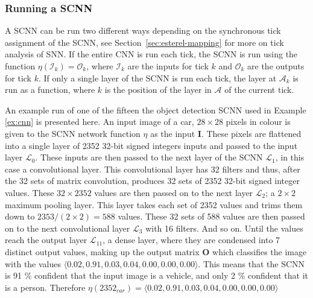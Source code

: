 \subsubsection{Running a \ac{SCNN}}
A \ac{SCNN} can be run two different ways depending on the synchronous tick assignment of the \ac{SCNN}, see Section~\ref{sec:esterel-mapping} for more on tick analysis of \ac{SNN}. 
If the entire CNN is run each tick, the \ac{SCNN} is run using the function $\eta(\mathcal{I}_k) = \mathcal{O}_k$, where $\mathcal{I}_k$ are the inputs for tick $k$ and $\mathcal{O}_k$ are the outputs for tick $k$.
If only a single layer of the \ac{SCNN} is run each tick, the layer at $\mathcal{A}_k$ is run as a function, where $k$ is the position of the layer in $\mathcal{A}$ of the current tick.

\begin{example}
	\label{ex:runcnn}
	An example run of one of the fifteen the object detection \ac{SCNN} used in Example \ref{ex:cnn} is presented here.
	An input image of a car, $28 \times 28$ pixels in colour is given to the \ac{SCNN} network function $\eta$ as the input \textbf{I}.
	These pixels are flattened into a single layer of 2352 32-bit signed integers inputs and passed to the input layer $\mathcal{L}_0$.
	These inputs are then passed to the next layer of the \ac{SCNN} $\mathcal{L}_1$, in this case a convolutional layer.
	This convolutional layer has 32 filters and thus, after the 32 sets of matrix convolution, produces 32 sets of 2352 32-bit signed integer values.
	These $32 \times 2352$ values are then passed on to the next layer $\mathcal{L}_2$; a $2 \times 2$ maximum pooling layer.
	This layer takes each set of 2352 values and trims them down to $2353 / (2 \times 2) = 588$ values.
	These 32 sets of 588 values are then passed on to the next convolutional layer $\mathcal{L}_3$ with 16 filters.
	And so on.
	Until the values reach the output layer $\mathcal{L}_11$, a dense layer, where they are condensed into 7 distinct output values, making up the output matrix \textbf{O} which classifies the image with the values $\langle 0.02, 0.91, 0.03, 0.04, 0.00, 0.00, 0.00 \rangle$.
	This means that the \ac{SCNN} is 91 \% confident that the input image is a vehicle, and only 2 \% confident that it is a person.
	Therefore $\eta(2352_{car}) = \langle 0.02, 0.91, 0.03, 0.04, 0.00, 0.00, 0.00 \rangle$
\end{example}

